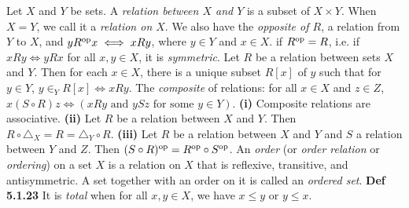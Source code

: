  Let $X$ and $Y$ be sets. A \textit{relation between $X$ and $Y$} is a subset of $X \times Y$. When $X = Y$, we call it a \textit{relation on $X$}. We also have the \textit{opposite of $R$}, a relation from $Y$ to $X$, and $y R^{\operatorname{op}}x \iff xRy$, where $y \in Y$ and $x \in X$. if $R^{\operatorname{op}} = R$, i.e. if $xRy \iff yRx$ for all $x, y \in X$, it is \textit{symmetric}.
 Let $R$ be a relation between sets $X$ and $Y$. Then for each $x \in X$, there is a unique subset $R[x]$ of $y$ such that for $y \in Y$, $y \in_Y R[x] \iff xRy$.
 The \textit{composite} of relations: for all $x \in X$ and $z \in Z$, $x(S \circ R)z \iff (xRy \text{ and } ySz \text{ for some } y \in Y)$.
 \textbf{(i)} Composite relations are associative. \textbf{(ii)} Let $R$ be a relation between $X$ and $Y$. Then $R \circ \triangle_X = R = \triangle_Y \circ R$. \textbf{(iii)} Let $R$ be a relation between $X$ and $Y$ and $S$ a relation between $Y$ and $Z$. Then $(S \circ R)^{\operatorname{op}} = R^{\operatorname{op}} \circ S^{\operatorname{op}}$.
 An \textit{order} (or \textit{order relation} or \textit{ordering}) on a set $X$ is a relation on $X$ that is reflexive, transitive, and antisymmetric. A set together with an order on it is called an \textit{ordered set}. \textbf{Def 5.1.23} It is \textit{total} when for all $x, y \in X$, we have $x \leq y$ or $y \leq x$.
